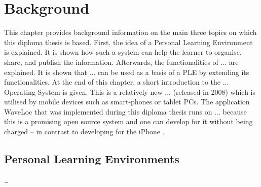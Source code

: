 \chapter{Background}
\label{cha:background}


This chapter provides background information on the main three topics on which this diploma thesis is based. First, the idea of a Personal Learning Environment is explained. It is shown how such a system can help the learner to organise, share, and publish the information. Afterwards, the functionalities of ... are explained. It is shown that ... can be used as a basis of a PLE by extending its functionalities. At the end of this chapter, a short introduction to the ... Operating System is given. This is a relatively new ... (released in 2008) which is utilised by mobile devices such as smart-phones or tablet PCs. The application WaveLoc that was implemented during this diploma thesis runs on ... because this is a promising \cite{canalysandroid} open source system and one can develop for it without being charged -- in contrast to developing for the iPhone \cite{iphonedev}.


\section{Personal Learning Environments}
\label{sec:background__personal_learning_environment}

\ldots{}